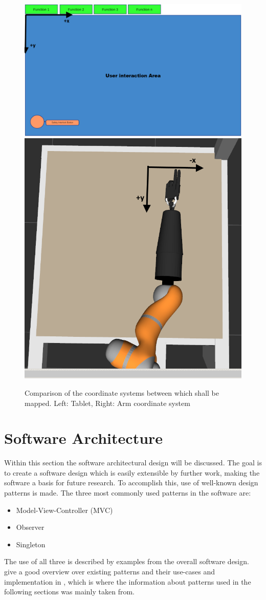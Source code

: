 \begin{figure}
	\caption{\label{fig:dfmt:coords}Comparison of the coordinate systems between which shall be mapped. Left: Tablet, Right: Arm coordinate system}
	\includegraphics[width=0.6\linewidth]{assets/chpt_concepts/dfmt_coord_screen.png}
	\includegraphics[width=0.4\linewidth]{assets/chpt_concepts/dfmt_coord_arm.png}
\end{figure}

\section{Software Architecture}

Within this section the software architectural design will be discussed. The goal is to create a software design which is easily extensible by further work, making the software a basis for future research. To accomplish this, use of well-known design patterns is made. The three most commonly used patterns in the software are:
\begin{itemize}
	\item Model-View-Controller (MVC)
	\item Observer
	\item Singleton
\end{itemize}

The use of all three is described by examples from the overall software design. \citeauthor{Eilebrecht2013} give a good overview over existing patterns and their use-cases and implementation in \cite{Eilebrecht2013}, which is where the information about patterns used in the following sections was mainly taken from.

